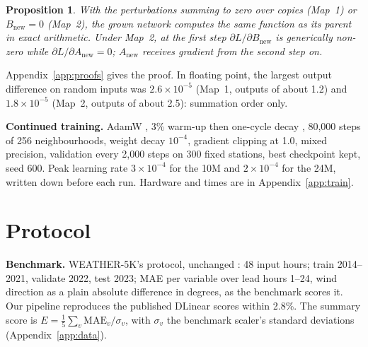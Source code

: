 \documentclass{article}
\newtheorem{proposition}{Proposition}
\begin{document}
\begin{proposition}\label{prop:grow}
With the perturbations summing to zero over copies (Map~1) or $B_{\text{new}}=0$ (Map~2), the grown network computes the
same function as its parent in exact arithmetic. Under Map~2, at the first step $\partial L/\partial B_{\text{new}}$ is
generically non-zero while $\partial L/\partial A_{\text{new}}=0$; $A_{\text{new}}$ receives gradient from the second
step on.
\end{proposition}
Appendix~\ref{app:proofs} gives the proof. In floating point, the largest output difference on random inputs was
$2.6\times10^{-5}$ (Map~1, outputs of about 1.2) and $1.8\times10^{-5}$ (Map~2, outputs of about 2.5): summation order only.

\textbf{Continued training.} AdamW \citep{loshchilov2019adamw}, 3\% warm-up then one-cycle decay
\citep{smith2019onecycle}, 80,000 steps of 256 neighbourhoods, weight decay $10^{-4}$, gradient clipping at 1.0,
mixed precision, validation every 2,000 steps on 300 fixed stations, best checkpoint kept, seed 600. Peak learning rate
$3\times10^{-4}$ for the 10M and $2\times10^{-4}$ for the 24M, written down before each run. Hardware and times are in
Appendix~\ref{app:train}.

\section{Protocol}
\label{sec:protocol}

\textbf{Benchmark.} WEATHER-5K's protocol, unchanged \citep{han2026weather5k}: 48 input hours; train 2014--2021,
validate 2022, test 2023; MAE per variable over lead hours 1--24, wind direction as a plain absolute difference in
degrees, as the benchmark scores it. Our pipeline reproduces the published DLinear scores within 2.8\%. The summary
score is $E=\frac{1}{5}\sum_{v}\mathrm{MAE}_v/\sigma_v$, with $\sigma_v$ the benchmark scaler's standard deviations
(Appendix~\ref{app:data}).
\end{document}
